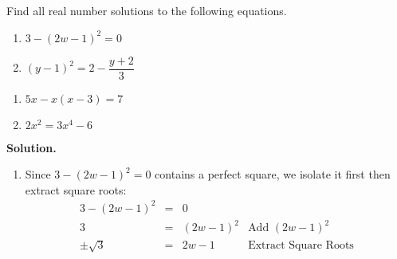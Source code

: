 \documentclass[10pt]{article}
\begin{document}
\begin{ex}\label{reviewquadraticex}  Find all real number solutions to the following equations.

\begin{multicols}{2}

\begin{enumerate}

\item $3 - (2w-1)^2 = 0$



\item  $(y-1)^2 = 2 - \dfrac{y+2}{3}$ 

\setcounter{HW}{\value{enumi}}

\end{enumerate}
\end{multicols}

\begin{multicols}{2}

\begin{enumerate}

\setcounter{enumi}{\value{HW}}

\item $5x - x(x-3) = 7$



\item $2x^2 = 3x^4 - 6$



\setcounter{HW}{\value{enumi}}

\end{enumerate}
\end{multicols}

\pagebreak

{\bf Solution.}

\begin{enumerate}

\item  Since $3 - (2w-1)^2 = 0$ contains a perfect square, we isolate it first then extract square roots: \[ \begin{array}{rclr}

3 - (2w-1)^2 & = & 0 & \\

3 & = & (2w-1)^2 & \text{Add $(2w-1)^2$} \\

\pm \sqrt{3} & = & 2w - 1 & \text{Extract Square Roots} \\


\end{array}\]
\end{enumerate}
\end{ex}
\end{document}
